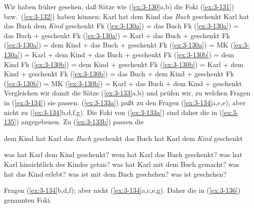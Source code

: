 \documentclass[output=paper]{langsci/langscibook}
\begin{document}
Wir haben früher gesehen, daß Sätze wie (\ref{ex:3-130}a,b) die Foki (\ref{ex:3-131})
bzw.\ (\ref{ex:3-132}) haben können:
\eal
\label{ex:3-130}
\ex
\label{ex:3-130a}
Karl hat dem Kind das \textit{Buch} geschenkt
\ex
\label{ex:3-130b}
Karl hat das Buch dem \textit{Kind} geschenkt
\zl
\eal
\label{ex:3-131}
\ex
\label{ex:3-131a}
Fk (\ref{ex:3-130a}) = das Buch
\ex
\label{ex:3-131b}
Fk (\ref{ex:3-130a}) = das Buch + geschenkt
\ex
\label{ex:3-131c}
Fk (\ref{ex:3-130a}) = Karl + das Buch + geschenkt
\ex
\label{ex:3-131d}
Fk (\ref{ex:3-130a}) = dem Kind + das Buch + geschenkt
\ex
\label{ex:3-131e}
Fk (\ref{ex:3-130a}) = MK (\ref{ex:3-130a}) = Karl + dem Kind + das Buch + geschenkt
\zl
\eal
\label{ex:3-132}
\ex
\label{ex:3-132a}
Fk (\ref{ex:3-130b}) = dem Kind
\ex
\label{ex:3-132b}
Fk (\ref{ex:3-130b}) = dem Kind + geschenkt
\ex
\label{ex:3-132c}
Fk (\ref{ex:3-130b}) = Karl + dem Kind + geschenkt
\ex
\label{ex:3-132d}
Fk (\ref{ex:3-130b}) = das Buch + dem Kind + geschenkt
\ex
\label{ex:3-132e}
Fk (\ref{ex:3-130b}) = MK (\ref{ex:3-130b}) = Karl + das Buch + dem Kind + geschenkt
\zl
\addlines
Vergleichen wir damit die Sätze (\ref{ex:3-133}a,b) und prüfen wir, zu welchen
Fragen in (\ref{ex:3-134}) sie passen. (\ref{ex:3-133a}) paßt zu den Fragen (\ref{ex:3-134}a,c,e);
aber nicht zu (\ref{ex:3-134}b,d,f,g). Die Foki von (\ref{ex:3-133a}) sind daher die in
(\ref{ex:3-135}) angegebenen. Zu (\ref{ex:3-133b}) passen die
\begin{exe}
\ex
\label{ex:3-133}
\begin{xlist}
\ex
\label{ex:3-133a}
dem Kind hat Karl das \textit{Buch} geschenkt
\ex
\label{ex:3-133b}
das Buch hat Karl dem \textit{Kind} geschenkt
\end{xlist}
\ex
\label{ex:3-134}
\begin{xlist}
\ex
\label{ex:3-134a}
was hat Karl dem Kind geschenkt?
\ex
\label{ex:3-134b}
wem hat Karl das Buch geschenkt?
\ex
\label{ex:3-134c}
was hat Karl hinsichtlich des Kindes getan?
\ex
\label{ex:3-134d}
was hat Karl mit dem Buch gemacht?
\ex
\label{ex:3-134e}
was hat das Kind erlebt?
\ex
\label{ex:3-134f}
was ist mit dem Buch geschehen?
\ex
\label{ex:3-134g}
was ist geschehen?
\end{xlist}
\end{exe}
Fragen (\ref{ex:3-134}b,d,f); aber nicht (\ref{ex:3-134}a,c,e,g). Daher die in (\ref{ex:3-136})
genannten Foki.
\end{document}
